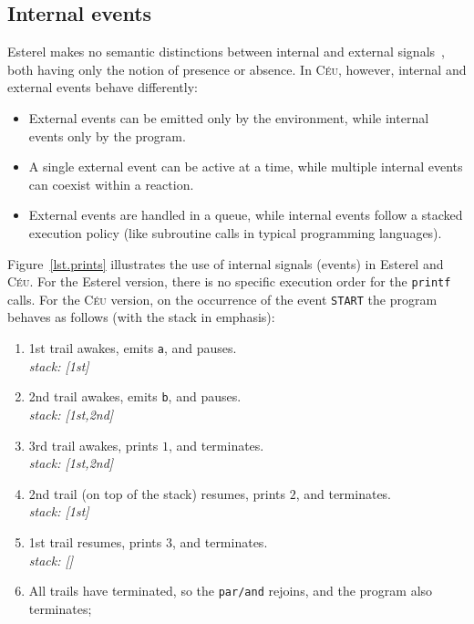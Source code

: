\documentclass{acm_proc_article-sp}
\newcommand{\CEU}{\textsc{C\'{e}u}\xspace}
\newcommand{\code}[1] {{\small{\texttt{#1}}}}
\newcommand{\1}{\;}
\newcommand{\2}{\;\;}
\newcommand{\3}{\;\;\;}
\newcommand{\5}{\;\;\;\;\;}
\begin{document}


\subsection{Internal events}
\label{sec.ceu.ints}

Esterel makes no semantic distinctions between internal and external 
signals~\cite{esterel.preemption}, both having only the notion of presence or
absence.
%
In \CEU, however, internal and external events behave differently:

\begin{itemize}
\item External events can be emitted only by the environment, while internal 
events only by the program.
\item A single external event can be active at a time, while multiple internal 
events can coexist within a reaction.
\item External events are handled in a queue, while internal events follow a 
stacked execution policy (like subroutine calls in typical programming 
languages).
\end{itemize}

Figure~\ref{lst.prints} illustrates the use of internal signals (events) in 
Esterel and \CEU.
%
For the Esterel version, there is no specific execution order for the 
\code{printf} calls.
%
For the \CEU version, on the occurrence of the event \code{START} the program 
behaves as follows (with the stack in emphasis):
%
{\small
\begin{enumerate}
\setlength{\itemsep}{0pt}
\item 1st trail awakes, emits \code{a}, and pauses.\\
    \emph{stack: [1st]}
\item 2nd trail awakes, emits \code{b}, and pauses.\\
    \emph{stack: [1st,2nd]}
\item 3rd trail awakes, prints $1$, and terminates.\\
    \emph{stack: [1st,2nd]}
\item 2nd trail (on top of the stack) resumes, prints $2$, and terminates.\\
    \emph{stack: [1st]}
\item 1st trail resumes, prints $3$, and terminates.\\
    \emph{stack: []}
\item All trails have terminated, so the \code{par/and} rejoins, and the 
program also terminates;
\end{enumerate}
}
\end{document}
